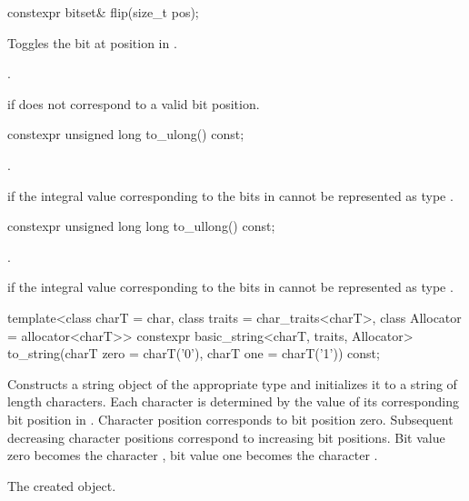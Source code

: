 %
\begin{itemdecl}
constexpr bitset& flip(size_t pos);
\end{itemdecl}

\begin{itemdescr}
\pnum
\effects
Toggles the bit at position  in
.

\pnum
\returns
{}.

\pnum
\throws
{}%
 if  does not correspond to a valid bit position.
\end{itemdescr}

%
\begin{itemdecl}
constexpr unsigned long to_ulong() const;
\end{itemdecl}

\begin{itemdescr}
\pnum
\returns
{}.

\pnum
\throws
{}%
 if the integral value 
corresponding to the bits in 
cannot be represented as type .
\end{itemdescr}

%
\begin{itemdecl}
constexpr unsigned long long to_ullong() const;
\end{itemdecl}

\begin{itemdescr}
\pnum
\returns
{}.

\pnum
\throws
{}%
 if the integral value 
corresponding to the bits in 
cannot be represented as type .
\end{itemdescr}

%
\begin{itemdecl}
template<class charT = char,
         class traits = char_traits<charT>,
         class Allocator = allocator<charT>>
  constexpr basic_string<charT, traits, Allocator>
    to_string(charT zero = charT('0'), charT one = charT('1')) const;
\end{itemdecl}

\begin{itemdescr}
\pnum
\effects
Constructs a string object of the appropriate type
and initializes it to a string of length  characters.
Each character is determined by the value of its corresponding bit position in
.
Character position  corresponds to bit position zero.
Subsequent decreasing character positions correspond to increasing bit
positions.
Bit value zero becomes the character ,
bit value one becomes the character
.

\pnum
\returns
The created object.
\end{itemdescr}

